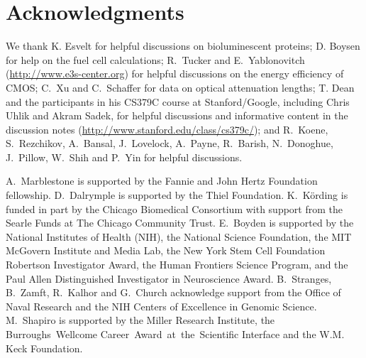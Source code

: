 \section{Acknowledgments}

We thank K. Esvelt for helpful discussions on bioluminescent proteins; D. Boysen for help on the fuel cell calculations; R.~Tucker and E.~Yablonovitch (\url{http://www.e3s-center.org}) for helpful discussions on the energy efficiency of CMOS; C.~Xu and C.~Schaffer for data on optical attenuation lengths; T. Dean and the participants in his CS379C course at Stanford/Google, including Chris Uhlik and Akram Sadek, for helpful discussions and informative content in the discussion notes (\url{http://www.stanford.edu/class/cs379c/}); and R.~Koene, S.~Rezchikov, A.~Bansal, J.~Lovelock, A.~Payne, R.~Barish, N.~Donoghue, J.~Pillow, W.~Shih and P.~Yin for helpful discussions.

A.~Marblestone is supported by the Fannie and John Hertz Foundation fellowship.
D.~Dalrymple is supported by the Thiel Foundation.
K.~K\"ording is funded in part by the Chicago Biomedical Consortium with support from the Searle Funds at The Chicago Community Trust.
E.~Boyden is supported by the National Institutes of Health (NIH), the National Science Foundation, the MIT
McGovern Institute and Media Lab, the New York Stem Cell Foundation Robertson Investigator
Award, the Human Frontiers Science Program, and the Paul Allen Distinguished Investigator in
Neuroscience Award.
B.~Stranges, B.~Zamft, R.~Kalhor and G.~Church acknowledge support from the Office of Naval Research and the NIH Centers of Excellence in Genomic Science.
M.~Shapiro is supported by the Miller Research Institute, the Burroughs~Wellcome Career~Award~at~the~Scientific Interface and the W.M. Keck Foundation.

\printbibliography[notsubtype=hide]


